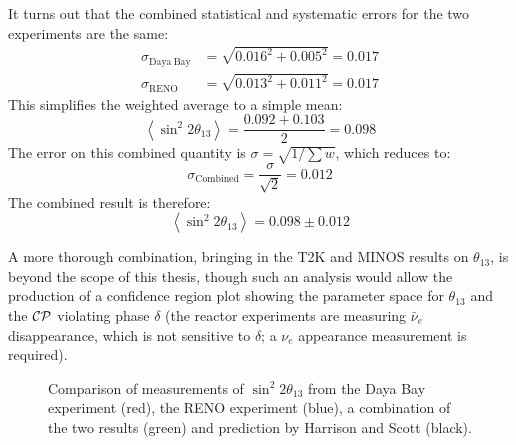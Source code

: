 It turns out that the combined statistical and systematic errors for the two experiments are the same:
\begin{align}
\sigma_{\mathrm{Daya~Bay}} & = \sqrt{0.016^2 + 0.005^2} = 0.017 \\
\sigma_{\mathrm{RENO}} & = \sqrt{0.013^2 + 0.011^2} = 0.017 \nonumber
\end{align}
This simplifies the weighted average to a simple mean:
\begin{equation}
\left<\sin^2 2\theta_{13}\right> = \frac{0.092 + 0.103}{2} = 0.098
\end{equation}
The error on this combined quantity is $\sigma = \sqrt{1 / \sum w}$, which reduces to:
\begin{equation}
\sigma_{\mathrm{Combined}} = \frac{\sigma}{\sqrt{2}} = 0.012
\end{equation}
The combined result is therefore:
\begin{equation}\label{eqn:theta_13_combined}
\left<\sin^2 2\theta_{13}\right> = 0.098 \pm 0.012
\end{equation}

A more thorough combination, bringing in the T2K and MINOS results on $\theta_{13}$, is beyond the scope of this thesis, though such an analysis would allow the production of a confidence region plot showing the parameter space for $\theta_{13}$ and the $\mathcal{C}\mathcal{P}$ violating phase $\delta$ (the reactor experiments are measuring $\bar{\nu}_e$ disappearance, which is not sensitive to $\delta$; a $\nu_e$ appearance measurement is required).

\begin{figure}
\centering
{}
\caption[Comparison of measurements of $\sin^2 2\theta_{13}$]{\label{fig:theta-13_results}Comparison of measurements of $\sin^2 2\theta_{13}$ from the Daya Bay experiment (red), the RENO experiment (blue), a combination of the two results (green) and prediction by Harrison and Scott (black).}
\end{figure}

